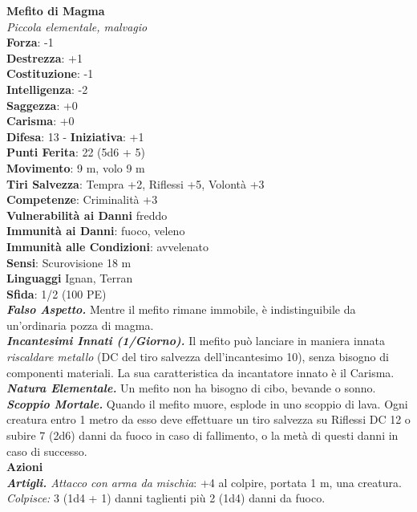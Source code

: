 \begin{multicols}{2}
\medskip\textbf{Mefito di Magma}\\
\emph{Piccola elementale, malvagio}\\
\textbf{Forza}: -1\\
\textbf{Destrezza}: +1\\
\textbf{Costituzione}: -1\\
\textbf{Intelligenza}: -2\\
\textbf{Saggezza}: +0\\
\textbf{Carisma}: +0\\
\textbf{Difesa}: 13 - \textbf{Iniziativa}: +1\\
\textbf{Punti Ferita}: 22 (5d6 + 5)\\
\textbf{Movimento}: 9 m, volo 9 m\\
\textbf{Tiri Salvezza}: Tempra +2, Riflessi +5, Volontà +3\\
\textbf{Competenze}: Criminalità +3\\
\textbf{Vulnerabilità ai Danni} freddo\\
\textbf{Immunità ai Danni}: fuoco, veleno\\
\textbf{Immunità alle Condizioni}: avvelenato\\
\textbf{Sensi}: Scurovisione 18 m\\
\textbf{Linguaggi} Ignan, Terran\\
\textbf{Sfida}: 1/2 (100 PE)\smallskip\\
\emph{\textbf{Falso Aspetto.}} Mentre il mefito rimane immobile, è indistinguibile da un'ordinaria pozza di magma.\\
\emph{\textbf{Incantesimi Innati (1/Giorno).}} Il mefito può lanciare in maniera innata \emph{riscaldare metallo} (DC del tiro salvezza dell'incantesimo 10), senza bisogno di componenti materiali. La sua caratteristica da incantatore innato è il Carisma.\\
\emph{\textbf{Natura Elementale.}} Un mefito non ha bisogno di cibo, bevande o sonno.\\
\emph{\textbf{Scoppio Mortale.}} Quando il mefito muore, esplode in uno scoppio di lava. Ogni creatura entro 1 metro da esso deve effettuare un tiro salvezza su Riflessi DC  12 o subire 7 (2d6) danni da fuoco in caso di fallimento, o la metà di questi danni in caso di successo.\\
\smallskip\textbf{Azioni}\\
\emph{\textbf{Artigli.} Attacco con arma da mischia}: +4 al colpire, portata 1 m, una creatura.\\
\emph{Colpisce:} 3 (1d4 + 1) danni taglienti più 2 (1d4) danni da fuoco.\\

\end{multicols}

